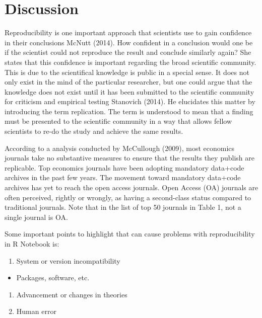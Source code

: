 \documentclass[
  12pt,
  twoside]{article}
\providecommand{\tightlist}{%
  \setlength{\itemsep}{0pt}\setlength{\parskip}{0pt}}
\begin{document}
\hypertarget{discussion}{%
\section{Discussion}\label{discussion}}

Reproducibility is one important approach that scientists use to gain
confidence in their conclusions McNutt (2014). How confident in a
conclusion would one be if the scientist could not reproduce the result
and conclude similarly again? She states that this confidence is
important regarding the broad scientific community. This is due to the
scientifical knowledge is public in a special sense. It does not only
exist in the mind of the particular researcher, but one could argue that
the knowledge does not exist until it has been submitted to the
scientific community for criticism and empirical testing Stanovich
(2014). He elucidates this matter by introducing the term replication.
The term is understood to mean that a finding must be presented to the
scientific community in a way that allows fellow scientists to re-do the
study and achieve the same results.

According to a analysis conducted by McCullough (2009), most economics
journals take no substantive measures to ensure that the results they
publish are replicable. Top economics journals have been adopting
mandatory data+code archives in the past few years. The movement toward
mandatory data+code archives has yet to reach the open access journals.
Open Access (OA) journals are often perceived, rightly or wrongly, as
having a second-class status compared to traditional journals. Note that
in the list of top 50 journals in Table 1, not a single journal is OA.

Some important points to highlight that can cause problems with
reproducibility in R Notebook is:

\begin{enumerate}
\def\labelenumi{\arabic{enumi}.}
\tightlist
\item
  System or version incompatibility
\end{enumerate}

\begin{itemize}
\tightlist
\item
  Packages, software, etc.
\end{itemize}

\begin{enumerate}
\def\labelenumi{\arabic{enumi}.}
\setcounter{enumi}{1}
\item
  Advancement or changes in theories
\item
  Human error
\end{enumerate}
\end{document}
